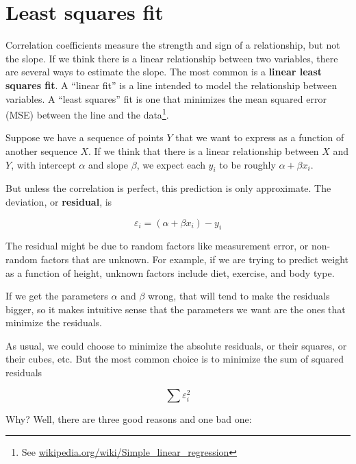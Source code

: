 \documentclass[12pt]{book}
\begin{document}
\section{Least squares fit}

\newcommand{\slope}{\beta}
\newcommand{\inter}{\alpha}

Correlation coefficients measure the strength and sign of a
relationship, but not the slope.  If we think there is a linear
relationship between two variables, there are several ways to estimate
the slope.  The most common is a {\bf linear least squares fit}.  A
``linear fit'' is a line intended to model the relationship between
variables.  A ``least squares'' fit is one that minimizes the mean
squared error (MSE) between the line and the data\footnote{See
  \url{wikipedia.org/wiki/Simple_linear_regression}}.

Suppose we have a sequence of points $Y$ that we want to express
as a function of another sequence $X$.  If we think that there is
a linear relationship between $X$ and $Y$, with intercept $\inter$
and slope $\slope$, we expect each $y_i$ to be roughly $\inter + \slope x_i$.

But unless the correlation is perfect, this prediction is only
approximate.  The deviation, or {\bf residual}, is 

\newcommand{\eps}{\varepsilon}

\[ \eps_i = (\inter + \slope x_i) - y_i \]

The residual might be due to random factors like measurement error,
or non-random factors that are unknown.  For example, if we are
trying to predict weight as a function of height, unknown factors
include diet, exercise, and body type.

If we get the parameters $\inter$ and $\slope$ wrong, that will tend
to make the residuals bigger, so it makes intuitive sense that the
parameters we want are the ones that minimize the residuals.

As usual, we could choose to minimize the absolute residuals, or
their squares, or their cubes, etc.  But the most common choice
is to minimize the sum of squared residuals

\[ \sum \eps_i^2 \]

Why?  Well, there are three good reasons and one bad one:
\end{document}
